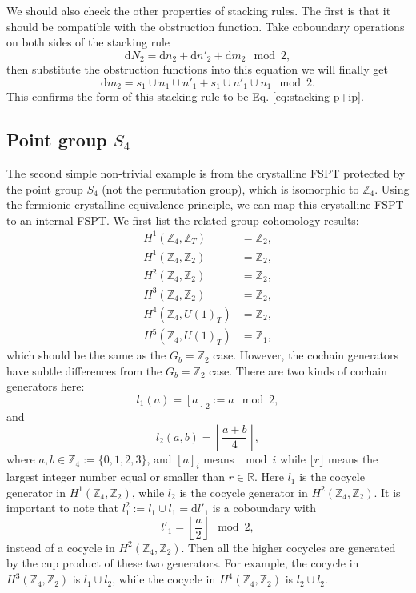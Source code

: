 \documentclass[%
 reprint,
 amsmath,amssymb,
 aps,
prb,
]{revtex4-2}
\begin{document}
We should also check the other properties of stacking rules.
The first is that it should be compatible with the obstruction function.
Take coboundary operations on both sides of the stacking rule 
\begin{equation}
\mathrm{d} N_2 = \mathrm{d} n_2 + \mathrm{d} n'_2 + \mathrm{d} m_2 \mod 2,
\end{equation}
then substitute the obstruction functions into this equation we will finally get 
\begin{equation}
\mathrm{d} m_2 = s_1 \cup n_1 \cup n'_1 + s_1 \cup n'_1 \cup n_1 \mod 2.
\end{equation}
This confirms the form of this stacking rule to be Eq. \eqref{eq:stacking p+ip}.


\subsection{Point group $S_4$}

The second simple non-trivial example is from the crystalline FSPT protected by the point group $S_4$ (not the permutation group), which is isomorphic to $\mathbb Z_4$.
Using the fermionic crystalline equivalence principle, we can map this crystalline FSPT to an internal FSPT.
We first list the related group cohomology results:
\begin{align}
H^1(\mathbb Z_4, \mathbb Z_T) &= \mathbb Z_2 , \\
H^1(\mathbb Z_4, \mathbb Z_2) &= \mathbb Z_2 ,\\
H^2(\mathbb Z_4, \mathbb Z_2) &= \mathbb Z_2 ,\\
H^3(\mathbb Z_4, \mathbb Z_2) &= \mathbb Z_2 ,\\
H^4(\mathbb Z_4, U(1)_T) &= \mathbb Z_2 , \\
H^5(\mathbb Z_4, U(1)_T) &= \mathbb Z_1 ,
\end{align}
which should be the same as the $G_b = \mathbb Z_2$ case.
However, the cochain generators have subtle differences from the $G_b = \mathbb Z_2$ case.
There are two kinds of cochain generators here:
\begin{equation}
l_1 (a) = [a]_2 := a \mod 2 ,
\end{equation}
and 
\begin{equation}
l_2 (a, b) = \left\lfloor \frac{a + b}{4} \right\rfloor ,
\end{equation}
where $a, b \in \mathbb Z_4 := \{ 0,1,2,3 \}$, and $[a]_i$ means $\mod i$ while $\lfloor r \rfloor$ means the largest integer number equal or smaller than $r \in \mathbb R$.
Here $l_1$ is the cocycle generator in $H^1(\mathbb Z_4, \mathbb Z_2)$, while $l_2$ is the cocycle generator in $H^2(\mathbb Z_4, \mathbb Z_2)$.
It is important to note that $l_1^2 := l_1 \cup l_1 = \mathrm{d} l'_1$ is a coboundary with 
\begin{equation}
l'_1 = \left\lfloor \frac{a}{2} \right\rfloor \mod 2 ,
\end{equation}
instead of a cocycle in $H^2(\mathbb Z_4, \mathbb Z_2)$.
Then all the higher cocycles are generated by the cup product of these two generators.
For example, the cocycle in $H^3(\mathbb Z_4, \mathbb Z_2)$ is $l_1 \cup l_2$, while the cocycle in $H^4(\mathbb Z_4, \mathbb Z_2)$ is $l_2 \cup l_2$.
\end{document}
